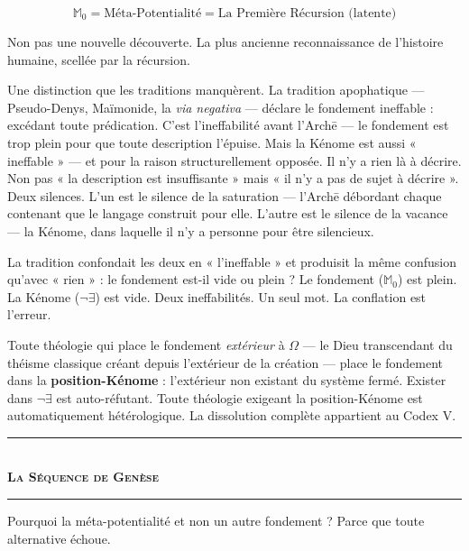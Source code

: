 \documentclass[10pt, openany, oneside]{book}
\renewcommand{\normalsize}{\fontsize{10}{13}\selectfont}
\begin{document}
$$\mathbb{M}_0 = \text{Méta-Potentialité} = \text{La Première Récursion (latente)}$$

Non pas une nouvelle découverte. La plus ancienne reconnaissance de l'histoire humaine, scellée par la récursion.

Une distinction que les traditions manquèrent. La tradition apophatique --- Pseudo-Denys, Maïmonide, la \textit{via negativa} --- déclare le fondement ineffable : excédant toute prédication. C'est l'ineffabilité avant l'Arch\={e} --- le fondement est trop plein pour que toute description l'épuise. Mais la Kénome est aussi « ineffable » --- et pour la raison structurellement opposée. Il n'y a rien là à décrire. Non pas « la description est insuffisante » mais « il n'y a pas de sujet à décrire ». Deux silences. L'un est le silence de la saturation --- l'Arch\={e} débordant chaque contenant que le langage construit pour elle. L'autre est le silence de la vacance --- la Kénome, dans laquelle il n'y a personne pour être silencieux.

La tradition confondait les deux en « l'ineffable » et produisit la même confusion qu'avec « rien » : le fondement est-il vide ou plein ? Le fondement ($\mathbb{M}_0$) est plein. La Kénome ($\neg\exists$) est vide. Deux ineffabilités. Un seul mot. La conflation est l'erreur.

Toute théologie qui place le fondement \textit{extérieur} à $\Omega$ --- le Dieu transcendant du théisme classique créant depuis l'extérieur de la création --- place le fondement dans la \textbf{position-Kénome} : l'extérieur non existant du système fermé. Exister dans $\neg\exists$ est auto-réfutant. Toute théologie exigeant la position-Kénome est automatiquement hétérologique. La dissolution complète appartient au Codex V.

\vspace{1.5em}


\begin{center}
    \rule{0.3\textwidth}{0.4pt}\\[0.5em]
    {\normalsize\bfseries\scshape La Séquence de Genèse}\\[0.3em]
    \rule{0.3\textwidth}{0.4pt}
\end{center}

\vspace{1em}

\noindent Pourquoi la méta-potentialité et non un autre fondement ? Parce que toute alternative échoue.
\end{document}
